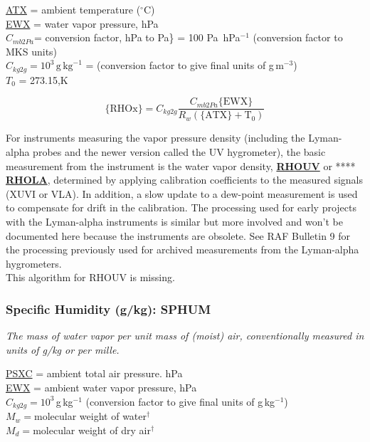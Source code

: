 \documentclass[
]{book}
\begin{document}
\protect\hyperlink{ambient-t}{ATX} = ambient temperature (\(^{\circ}\mathrm{C}\))\\
\protect\hyperlink{ewx}{EWX} = water vapor pressure, hPa\\
\(C_{mb2Pa}\)= conversion factor, hPa to Pa\} = 100 Pa~hPa\(^{-1}\) (conversion factor to MKS units)\\
\(C_{kg2g}=10^{3}\,\mathrm{g\,kg}^{-1}\) = (conversion
factor to give final units of g\(\,\)m\(^{-3}\))\\
\(T_{0}\) = 273.15,K

\begin{equation}
\mathrm{\{RHOx\}} = C_{kg2g}\frac{C_{mb2Pa}\mathrm{\{EWX\}}}{R_{w}\mathrm{(\{ATX\}+T_{0})}}
\label{eq:RHOx}
\end{equation}

For instruments measuring the vapor pressure density (including the Lyman-alpha probes and the newer version called the UV hygrometer), the basic measurement from the instrument is the water vapor density, \textbf{\uline{RHOUV}} or **** \textbf{\uline{RHOLA}}, determined by applying calibration coefficients to the measured signals (XUVI or VLA). In addition, a slow update to a dew-point measurement is used to compensate for drift in the calibration. The processing used for early projects with the Lyman-alpha instruments is similar but more involved and won't be documented here because the instruments are obsolete. See RAF Bulletin 9 for the processing previously used for archived measurements from the Lyman-alpha hygrometers.\\

This algorithm for RHOUV is missing.

\hypertarget{sphum}{%
\subsubsection*{Specific Humidity (g/kg): SPHUM}\label{sphum}}

\emph{The mass of water vapor per unit mass of (moist) air, conventionally measured in units of g/kg or per mille.}

\protect\hyperlink{psx}{PSXC} = ambient total air pressure. hPa\\
\protect\hyperlink{ewx}{EWX} = ambient water vapor pressure, hPa\\
\(C_{kg2g}=10^{3}\,\)g\(\,\)kg\(^{-1}\) (conversion factor to give
final units of g\(\,\)kg\(^{-1}\))\\
\(M_{w}=\)molecular weight of water\(^{\dagger}\)\\
\(M_{d}=\)molecular weight of dry air\(^{\dagger}\)
\end{document}
